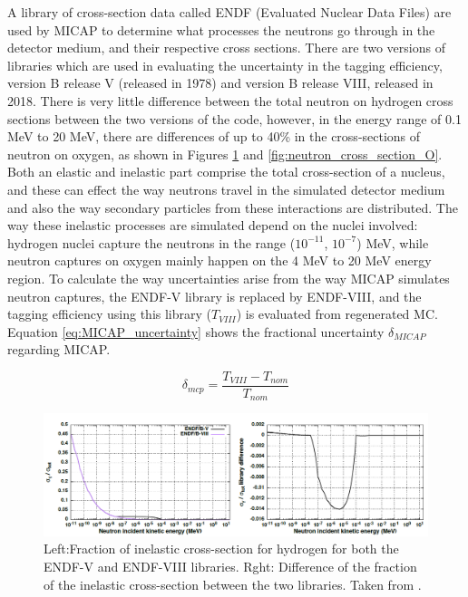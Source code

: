 A library of cross-section data called ENDF (Evaluated Nuclear Data Files) are used by MICAP to determine what processes the neutrons go through in the detector medium, and their respective cross sections. There are two versions of libraries which are used in evaluating the uncertainty in the tagging efficiency, version B release V (released in 1978) and version B release VIII, released in 2018. There is very little difference between the total neutron on hydrogen cross sections between the two versions of the code, however, in the energy range of 0.1 MeV to 20 MeV, there are differences of up to 40\% in the cross-sections of neutron on oxygen, as shown in Figures \ref{fig:neutron_cross_section_H} and \ref{fig:neutron_cross_section_O}. Both an elastic and inelastic part comprise the total cross-section of a nucleus, and these can effect the way neutrons travel in the simulated detector medium and also the way secondary particles from these interactions are distributed. The way these inelastic processes are simulated depend on the nuclei involved: hydrogen nuclei capture the neutrons in the range ($10^{-11}$, $10^{-7}$) MeV, while neutron captures on oxygen mainly happen on the 4 MeV to 20 MeV energy region.  To calculate the way uncertainties arise from the way MICAP simulates neutron captures, the ENDF-V library is replaced by ENDF-VIII, and the tagging efficiency using this library ($T_{VIII}$) is evaluated from regenerated MC. Equation \ref{eq:MICAP_uncertainty} shows the fractional uncertainty $\delta_{MICAP}$ regarding MICAP.  

\begin{equation}
    \delta_{m c p}=\frac{T_{V I I I}-T_{n o m}}{T_{n o m}}
\label{eq:MICAP_uncertainty}
\end{equation}

\begin{figure}[!htb]
    \centering
    \includegraphics[width=\textwidth]{Figures/neutron_cross_section_endf_H.PNG}
\caption{Left:Fraction of inelastic cross-section for hydrogen for both the ENDF-V and ENDF-VIII libraries. Rght: Difference of the fraction of the inelastic cross-section between the two libraries. Taken from \cite{tn415_fiacob}.}
\label{fig:neutron_cross_section_H}
\end{figure}

